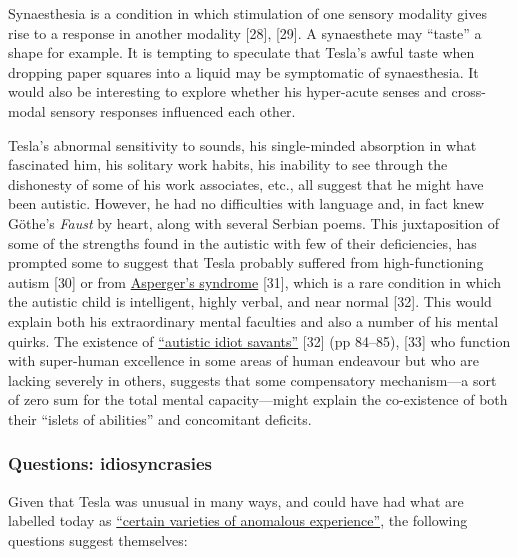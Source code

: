 \documentclass[
  12pt,
  british,
  a4paper,
]{article}
\begin{document}
Synaesthesia is a condition in which stimulation of one sensory modality
gives rise to a response in another modality {[}28{]}, {[}29{]}. A
synaesthete may ``taste'' a shape for example. It is tempting to
speculate that Tesla's awful taste when dropping paper squares into a
liquid may be symptomatic of synaesthesia. It would also be interesting
to explore whether his hyper-acute senses and cross-modal sensory
responses influenced each other.

Tesla's abnormal sensitivity to sounds, his single-minded absorption in
what fascinated him, his solitary work habits, his inability to see
through the dishonesty of some of his work associates, etc., all suggest
that he might have been autistic. However, he had no difficulties with
language and, in fact knew Göthe's \emph{Faust} by heart, along with
several Serbian poems. This juxtaposition of some of the strengths found
in the autistic with few of their deficiencies, has prompted some to
suggest that Tesla probably suffered from high-functioning autism
{[}30{]} or from
\href{https://en.wikipedia.org/wiki/Asperger_syndrome}{Asperger's
syndrome} {[}31{]}, which is a rare condition in which the autistic
child is intelligent, highly verbal, and near normal {[}32{]}. This
would explain both his extraordinary mental faculties and also a number
of his mental quirks. The existence of
\href{https://en.wikipedia.org/wiki/Savant_syndrome}{``autistic idiot
savants''} {[}32{]} (pp 84--85), {[}33{]} who function with super-human
excellence in some areas of human endeavour but who are lacking severely
in others, suggests that some compensatory mechanism---a sort of zero
sum for the total mental capacity---might explain the co-existence of
both their ``islets of abilities'' and concomitant deficits.

\hypertarget{questions-idiosyncrasies}{%
\subsubsection{Questions:
idiosyncrasies}\label{questions-idiosyncrasies}}

Given that Tesla was unusual in many ways, and could have had what are
labelled today as
\href{https://en.wikipedia.org/wiki/Varieties_of_Anomalous_Experience}{``certain
varieties of anomalous experience''}, the following questions suggest
themselves:
\end{document}
